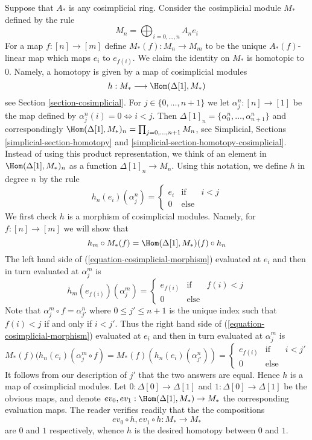 \begin{example}
\label{example-cosimplicial-module}
Suppose that $A_*$ is any cosimplicial ring.
Consider the cosimplicial module $M_*$ defined by the rule
$$
M_n = \bigoplus\nolimits_{i = 0, ..., n} A_n e_i
$$
For a map $f : [n] \to [m]$ define $M_*(f) : M_n \to M_m$
to be the unique $A_*(f)$-linear map which maps $e_i$ to $e_{f(i)}$.
We claim the identity on $M_*$ is homotopic to $0$.
Namely, a homotopy is given by a map of cosimplicial modules
$$
h : M_* \longrightarrow \Hom(\Delta[1], M_*)
$$
see Section \ref{section-cosimplicial}.
For $j \in \{0, \ldots, n + 1\}$ we let $\alpha^n_j : [n] \to [1]$ be the map
defined by $\alpha^n_j(i) = 0 \Leftrightarrow i < j$. Then
$\Delta[1]_n = \{\alpha^n_0, \ldots, \alpha^n_{n + 1}\}$ and correspondingly
$\Hom(\Delta[1], M_*)_n = \prod_{j = 0, \ldots, n + 1} M_n$, see
Simplicial, Sections \ref{simplicial-section-homotopy} and
\ref{simplicial-section-homotopy-cosimplicial}. Instead of using
this product representation, we think of an element
in $\Hom(\Delta[1], M_*)_n$ as a function $\Delta[1]_n \to M_n$.
Using this notation, we define $h$ in degree $n$ by the rule
$$
h_n(e_i)(\alpha^n_j) =
\left\{
\begin{matrix}
e_{i} & \text{if} & i < j \\
0 & \text{else} 
\end{matrix}
\right.
$$
We first check $h$ is a morphism of cosimplicial modules. Namely, for
$f : [n] \to [m]$ we will show that
\begin{equation}
\label{equation-cosimplicial-morphism}
h_m \circ M_*(f) = \Hom(\Delta[1], M_*)(f) \circ h_n
\end{equation}
The left hand side of (\ref{equation-cosimplicial-morphism}) evaluated at
$e_i$ and then in turn evaluated at $\alpha^m_j$ is
$$
h_m(e_{f(i)})(\alpha^m_j) =
\left\{
\begin{matrix}
e_{f(i)} & \text{if} & f(i) < j \\
0 & \text{else}
\end{matrix}
\right.
$$
Note that $\alpha^m_j \circ f = \alpha^n_{j'}$ where
$0 \leq j' \leq n + 1$ is the unique index such that $f(i) < j$
if and only if $i < j'$. Thus the right hand side of
(\ref{equation-cosimplicial-morphism}) evaluated at $e_i$
and then in turn evaluated at $\alpha^m_j$ is
$$
M_*(f)(h_n(e_i)(\alpha^m_j \circ f) =
M_*(f)(h_n(e_i)(\alpha^n_{j'})) =
\left\{
\begin{matrix}
e_{f(i)} & \text{if} & i < j' \\
0 & \text{else} 
\end{matrix}
\right.
$$
It follows from our description of $j'$ that the two answers are equal.
Hence $h$ is a map of cosimplicial modules.
Let $0 : \Delta[0] \to \Delta[1]$ and
$1 : \Delta[0] \to \Delta[1]$ be the obvious maps, and denote
$ev_0, ev_1 : \Hom(\Delta[1], M_*) \to M_*$ the corresponding
evaluation maps. The reader verifies readily that the
the compositions
$$
ev_0 \circ h, ev_1 \circ h : M_* \longrightarrow M_*
$$
are $0$ and $1$ respectively, whence $h$ is the desired homotopy between
$0$ and $1$.
\end{example}


